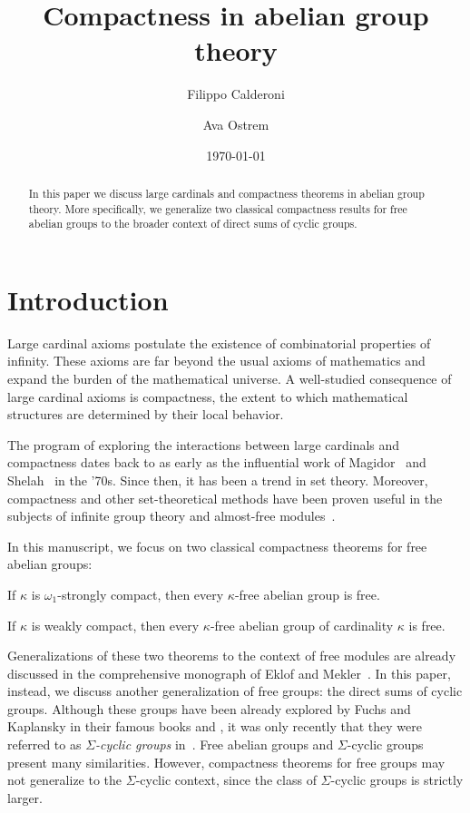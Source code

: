 \documentclass[a4paper]{amsart}
\title[Compactness in abelian groups]{Compactness in abelian group theory}
\author[F.~Calderoni]{Filippo Calderoni}
\author[A.~Ostrem]{Ava Ostrem}
\date{\today} %
\newenvironment{enumerate-(1)}{\begin{enumerate}[label={\upshape (\arabic*)}, leftmargin=2pc]}{\end{enumerate}}
\theoremstyle{definition}
\theoremstyle{remark}
\numberwithin{equation}{section}
\begin{document}
\begin{abstract}
In this paper we discuss large cardinals and compactness theorems in abelian group theory.
More specifically, we generalize two classical compactness results for free abelian groups to the broader context of direct sums of cyclic groups.
\end{abstract}

\maketitle

\section{Introduction}


Large cardinal axioms postulate the existence of combinatorial properties of infinity. These axioms are far beyond the usual axioms of mathematics and expand the burden of the mathematical universe. A well-studied consequence of large cardinal axioms is compactness, the extent to which mathematical structures are determined by their local behavior.


The program of exploring the interactions between large cardinals and compactness dates back to as early as the influential work of Magidor~\cite{Mag71} and Shelah~\cite{She75} in the '70s. Since then, it has been a trend in set theory. Moreover, compactness and other set-theoretical methods have been proven useful in the subjects of infinite group theory and almost-free modules~\cite{BagMag,Cor,CorPov,CPT, MagShe, KanKos}.

In this manuscript, we focus on two classical compactness theorems for free abelian groups:

\begin{enumerate-(1)}
\item 
If \(\kappa\) is \(\omega_1\)-strongly compact, then every \(\kappa\)-free abelian group is free.
\item 
If \(\kappa\) is weakly compact, then every \(\kappa\)-free abelian group of cardinality \(\kappa\) is free.
\end{enumerate-(1)}


Generalizations of these two theorems to the context of free modules are already discussed in the comprehensive monograph of Eklof and Mekler~\cite{EklMek}. In this paper, instead, we discuss another generalization of free groups: the direct sums of cyclic groups. Although these groups have been already explored by Fuchs and Kaplansky in their famous books \cite{Fuc58} and \cite{Kap54}, it was only recently that they were referred to as \emph{\(\Sigma\)-cyclic groups} in~\cite{Fuc15}. Free abelian groups and \(\Sigma\)-cyclic groups present many similarities. However, compactness theorems for free groups may not generalize to the \(\Sigma\)-cyclic context, since the class of \(\Sigma\)-cyclic groups is strictly larger.
\end{document}

